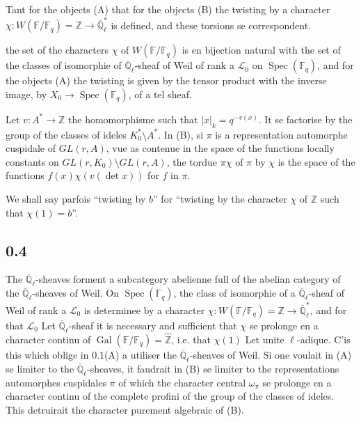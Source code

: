 \documentclass[11pt,a4paper]{article}
\theoremstyle{plain}
\theoremstyle{definition}
\DeclareMathOperator{\Spec}{Spec}
\DeclareMathOperator{\Gal}{Gal}
\begin{document}
Tant for the objects (A) that for the objects (B) the twisting by a character $\chi: W(\mathbb{F}/\mathbb{F}_q) = \mathbb{Z} \to \overline{\mathbb{Q}}_\ell^*$ is defined, and these torsions se correspondent.

the set of the characters $\chi$ of $W(\mathbb{F}/\mathbb{F}_q)$ is en bijection natural with the set of the classes of isomorphie of $\overline{\mathbb{Q}}_\ell$-sheaf of Weil of rank a $\mathcal{L}_0$ on $\Spec(\mathbb{F}_q)$, and for the objects (A) the twisting is given by the tensor product with the inverse image, by $X_0 \to \Spec(\mathbb{F}_q)$, of a tel sheaf.

Let $v: A^* \to \mathbb{Z}$ the homomorphisme such that $|x|_k = q^{-v(x)}$. It se factorise by the group of the classes of ideles $K_0^* \setminus A^*$. In (B), si $\pi$ is a representation automorphe cuspidale of $GL(r,A)$, vue as contenue in the space of the functions locally constants on $GL(r,K_0) \setminus GL(r,A)$, the tordue $\pi\chi$ of $\pi$ by $\chi$ is the space of the functions $f(x)\chi(v(\det x))$ for $f$ in $\pi$.

We shall say parfois ``twisting by $b$'' for ``twisting by the character $\chi$ of $\mathbb{Z}$ such that $\chi(1)=b$''.

\subsection*{0.4}

The $\overline{\mathbb{Q}}_\ell$-sheaves forment a subcategory abelienne full of the abelian category of the $\overline{\mathbb{Q}}_\ell$-sheaves of Weil. On $\Spec(\mathbb{F}_q)$, the class of isomorphie of a $\overline{\mathbb{Q}}_\ell$-sheaf of Weil of rank a $\mathcal{L}_0$ is determinee by a character $\chi: W(\mathbb{F}/\mathbb{F}_q) = \mathbb{Z} \to \overline{\mathbb{Q}}_\ell^*$, and for that $\mathcal{L}_0$ Let $\overline{\mathbb{Q}}_\ell$-sheaf it is necessary and sufficient that $\chi$ se prolonge en a character continu of $\Gal(\mathbb{F}/\mathbb{F}_q) = \hat{\mathbb{Z}}$, i.e. that $\chi(1)$ Let unite $\ell$-adique. C'is this which oblige in 0.1(A) a utiliser the $\overline{\mathbb{Q}}_\ell$-sheaves of Weil. Si one voulait in (A) se limiter to the $\overline{\mathbb{Q}}_\ell$-sheaves, it faudrait in (B) se limiter to the representations automorphes cuspidales $\pi$ of which the character central $\omega_\pi$ se prolonge en a character continu of the complete profini of the group of the classes of ideles. This detruirait the character purement algebraic of (B).
\end{document}
